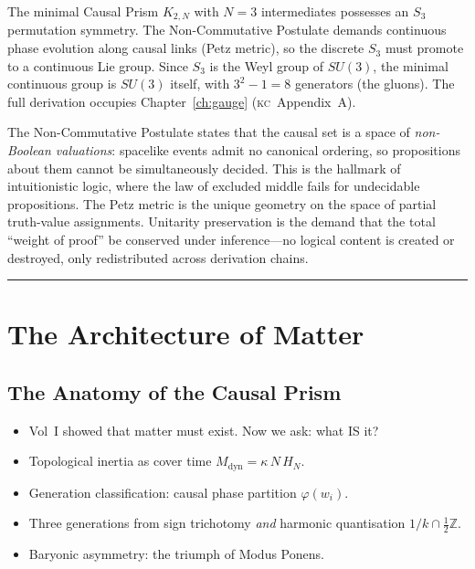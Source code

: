 \documentclass[11pt, a4paper, openany]{book}
\newcommand{\KC}[1]{\textnormal{(\textsc{kc}~#1)}}
\newenvironment{introduction}[1][Modulo Overview]{%
  \begin{tcolorbox}[
    enhanced,colback=structure!5,colframe=structure,
    colbacktitle=structure,coltitle=white,
    fonttitle=\small\bfseries,title={#1},
    arc=2pt,boxrule=0.7pt,
    left=8pt,right=8pt,top=6pt,bottom=6pt,
    before skip=12pt,after skip=12pt
  ]\itshape\begin{itemize}[leftmargin=*,itemsep=2pt,parsep=0pt]
}{%
  \end{itemize}\end{tcolorbox}
}
\begin{document}
The minimal Causal Prism $K_{2,N}$ with $N = 3$ intermediates possesses an $S_3$ permutation symmetry. The Non-Commutative Postulate demands continuous phase evolution along causal links (Petz metric), so the discrete $S_3$ must promote to a continuous Lie group. Since $S_3$ is the Weyl group of $SU(3)$, the minimal continuous group is $SU(3)$ itself, with $3^2 - 1 = 8$ generators (the gluons). The full derivation occupies Chapter~\ref{ch:gauge} \KC{Appendix~A}.

\begin{logicalreading}
The Non-Commutative Postulate states that the causal set is a space of \emph{non-Boolean valuations}: spacelike events admit no canonical ordering, so propositions about them cannot be simultaneously decided. This is the hallmark of intuitionistic logic, where the law of excluded middle fails for undecidable propositions. The Petz metric is the unique geometry on the space of partial truth-value assignments. Unitarity preservation is the demand that the total ``weight of proof'' be conserved under inference---no logical content is created or destroyed, only redistributed across derivation chains.
\end{logicalreading}

\bigskip
\begin{center}
\rule{0.4\textwidth}{0.5pt}
\end{center}

\part{The Architecture of Matter}
\setcounter{chapter}{10}

\chapter{The Anatomy of the Causal Prism}\label{ch:anatomy}

\begin{introduction}
  \item Vol~I showed that matter must exist. Now we ask: what IS it?
  \item Topological inertia as cover time $M_{\mathrm{dyn}} = \kappa\,N\,H_N$.
  \item Generation classification: causal phase partition $\varphi(w_i)$.
  \item Three generations from sign trichotomy \emph{and} harmonic quantisation $1/k \cap \tfrac{1}{2}\mathbb{Z}$.
  \item Baryonic asymmetry: the triumph of Modus Ponens.
\end{introduction}
\end{document}
